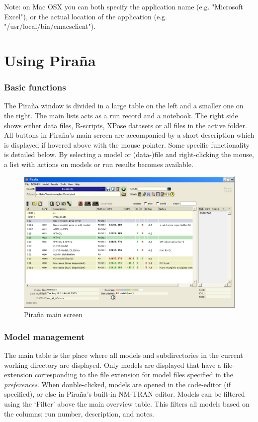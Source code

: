 \documentclass[a4,11pt]{report} \usepackage[pdftex]{graphicx}
\begin{document}
Note: on Mac OSX you can both specify the application name
(e.g. "Microsoft Excel"), or the actual location of the application
(e.g. "/usr/local/bin/emacsclient").

\pagebreak
\section{Using Pira\~na}

\subsubsection*{Basic functions} The Pira\~na window is divided in a
large table on the left and a smaller one on the right. The main
lists acts as a run record and a notebook. The right side
shows either data files, R-scripts, XPose datasets or all files in the
active folder. All buttons in Pira\~na's main screen are accompanied
by a short description which is displayed if hovered above with the
mouse pointer. Some specific functionality is detailed below. By
selecting a model or (data-)file and right-clicking the mouse, a list
with actions on models or run results becomes available.

\begin{figure}[hb] \centering
    \includegraphics[scale=0.3]{images/main_screen_2.png}
    \caption{Pira\~na main screen}
\end{figure}

\subsubsection*{Model management} The main table is the place
where all models and subdirectories in the current working directory
are displayed. Only models are displayed that have a file-extension
corresponding to the file extension for model files specified in the
\textit{preferences}. When double-clicked, models are opened in the
code-editor (if specified), or else in Pira\~na's built-in NM-TRAN
editor. Models can be filtered using the `Filter' above the main
overview table. This filters all models based on the columns: run
number, description, and notes.\\
\end{document}
